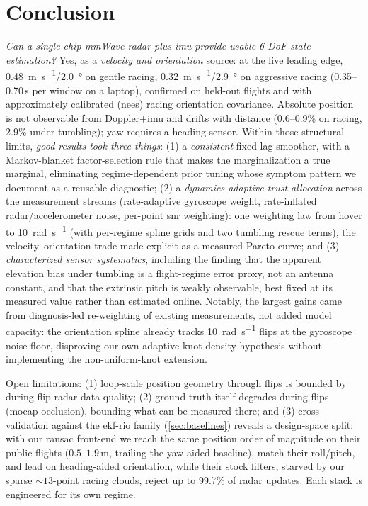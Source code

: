 \section{Conclusion}
\label{sec:conclusion}

\emph{Can a single-chip mmWave radar plus \ac{imu} provide usable 6-DoF
state estimation?}  Yes, as a \emph{velocity and orientation}
source: at the live leading edge,
\SI{0.48}{\metre\per\second}/\SI{2.0}{\degree} on gentle racing,
\SI{0.32}{\metre\per\second}/\SI{2.9}{\degree} on aggressive racing
(0.35--0.70\,s per window on a laptop), confirmed on held-out flights
and with approximately calibrated (\ac{nees}) racing orientation covariance.
Absolute position is not observable from Doppler+\ac{imu} and drifts with
distance (0.6--0.9\% on racing, 2.9\% under tumbling); yaw requires a
heading sensor.  Within those structural limits, \emph{good results
took three things}: (1) a \emph{consistent} fixed-lag smoother, with a
Markov-blanket factor-selection rule that makes the marginalization a
true marginal, eliminating regime-dependent prior tuning whose
symptom pattern we document as a reusable diagnostic;
(2) a \emph{dynamics-adaptive trust allocation} across the
measurement streams (rate-adaptive gyroscope weight, rate-inflated
radar/accelerometer noise, per-point \ac{snr} weighting): one weighting
law from hover to \SI{10}{\radian\per\second} (with per-regime spline grids
and two tumbling rescue terms), the velocity--orientation trade made
explicit as a measured Pareto curve;
and (3) \emph{characterized sensor systematics}, including the
finding that the apparent elevation bias under tumbling is a
flight-regime error proxy, not an antenna constant, and that the
extrinsic pitch is weakly observable, best fixed at its measured value
rather than estimated online.  Notably, the largest gains came from
diagnosis-led re-weighting of existing measurements, not added model
capacity: the orientation spline already tracks \SI{10}{\radian\per\second}
flips at the gyroscope noise floor, disproving our own adaptive-knot-density
hypothesis without implementing the non-uniform-knot extension.

Open limitations: (1) loop-scale position geometry through flips is
bounded by during-flip radar data quality; (2) ground truth itself degrades during flips
(\ac{mocap} occlusion), bounding what can be measured there; and
(3) cross-validation against the \ac{ekf}-\ac{rio} family
(\autoref{sec:baselines}) reveals a design-space split: with our
\ac{ransac} front-end we reach the same position order of magnitude on
their public flights ($0.5$--$1.9$\,m, trailing the yaw-aided baseline),
match their roll/pitch, and lead on heading-aided orientation, while their
stock filters, starved by our sparse ${\sim}13$-point racing clouds, reject
up to 99.7\% of radar updates.  Each stack is engineered for its own regime.

